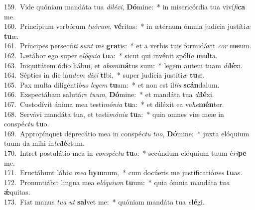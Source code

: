 {159.~}Vide quóniam mandáta tua \textit{di}\textit{lé}\textit{xi}, \textbf{Dó}mine:~* in misericórdia tua viví\textit{fi}\textbf{ca} me.\\
{160.~}Princípium verbórum \textit{tu}\textit{ó}\textit{rum}, \textbf{vé}ritas:~* in ætérnum ómnia judícia justíti\textit{æ} \textbf{tu}æ.\\
{161.~}Príncipes persecú\textit{ti} \textit{sunt} \textit{me} \textbf{gra}tis:~* et a verbis tuis formidávit \textit{cor} \textbf{me}um.\\
{162.~}Lætábor ego super e\textit{ló}\textit{qui}\textit{a} \textbf{tu}a:~* sicut qui invénit spóli\textit{a} \textbf{mul}ta.\\
{163.~}Iniquitátem ódio hábui, et \textit{a}\textit{bo}\textit{mi}\textbf{ná}tus sum:~* legem autem tuam \textit{di}\textbf{lé}xi.\\
{164.~}Sépties in die lau\textit{dem} \textit{di}\textit{xi} \textbf{ti}bi,~* super judícia justíti\textit{æ} \textbf{tu}æ.\\
{165.~}Pax multa diligénti\textit{bus} \textit{le}\textit{gem} \textbf{tu}am:~* et non est il\textit{lis} \textbf{scán}dalum.\\
{166.~}Exspectábam salutá\textit{re} \textit{tu}\textit{um}, \textbf{Dó}mine:~* et mandáta tua \textit{di}\textbf{lé}xi.\\
{167.~}Custodívit ánima mea testi\textit{mó}\textit{ni}\textit{a} \textbf{tu}a:~* et diléxit ea ve\textit{he}\textbf{mén}ter.\\
{168.~}Servávi mandáta tua, et testi\textit{mó}\textit{ni}\textit{a} \textbf{tu}a:~* quia omnes viæ meæ in conspé\textit{ctu} \textbf{tu}o.\\
{169.~}Appropínquet deprecátio mea in conspé\textit{ctu} \textit{tu}\textit{o}, \textbf{Dó}mine:~* juxta elóquium tuum da mihi in\textit{tel}\textbf{lé}ctum.\\
{170.~}Intret postulátio mea in \textit{con}\textit{spé}\textit{ctu} \textbf{tu}o:~* secúndum elóquium tuum é\textit{ri}\textbf{pe} me.\\
{171.~}Eructábunt lábi\textit{a} \textit{me}\textit{a} \textbf{hym}num,~* cum docúeris me justificatió\textit{nes} \textbf{tu}as.\\
{172.~}Pronuntiábit lingua mea e\textit{ló}\textit{qui}\textit{um} \textbf{tu}um:~* quia ómnia mandáta tu\textit{a} \textbf{ǽ}quitas.\\
{173.~}Fiat manus \textit{tu}\textit{a} \textit{ut} \textbf{sal}vet me:~* quóniam mandáta tua \textit{e}\textbf{lé}gi.\\
